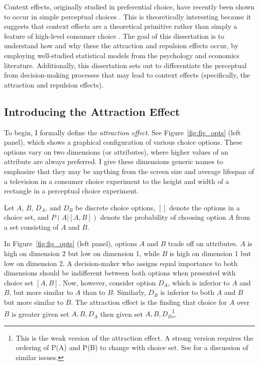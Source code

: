 Context effects, originally studied in preferential choice, have recently been shown to occur in simple perceptual choices \parencite{trueblood2013not,spektorWhenGoodLooks2018b,liaoInfluenceDistanceDecoy2021,spektorRepulsionEffectPreferential2022,evansImpactPresentationOrder2021}. This is theoretically interesting because it suggests that context effects are a theoretical primitive rather than simply a feature of high-level consumer choice \parencite{trueblood2013not}. The goal of this dissertation is to understand how and why these the attraction and repulsion effects occur, by employing well-studied statistical models from the psychology and economics literature. Additionally, this dissertation sets out to differentiate the perceptual from decision-making processes that may lead to context effects (specifically, the attraction and repulsion effects).

\subsection{Introducing the Attraction Effect}

To begin, I formally define the \textit{attraction effect}. See Figure~\ref{fig:fig_opts} (left panel), which shows a graphical configuration of various choice options. These options vary on two dimensions (or attributes), where higher values of an attribute are always preferred. I give these dimensions generic names to emphasize that they may be anything from the screen size and average lifespan of a television in a consumer choice experiment to the height and width of a rectangle in a perceptual choice experiment.

Let $A$, $B$, $D_{A}$, and $D_{B}$ be discrete choice options, $[]$ denote the options in a choice set, and $P(A|[A,B])$ denote the probability of choosing option $A$ from a set consisting of $A$ and $B$. 

In Figure~\ref{fig:fig_opts} (left panel), options $A$ and $B$ trade off on attributes. $A$ is high on dimension 2 but low on dimension 1, while $B$ is high on dimension 1 but low on dimension 2. A decision-maker who assigns equal importance to both dimensions should be indifferent between both options when presented with choice set $[A,B]$. Now, however, consider option $D_{A}$, which is inferior to $A$ and $B$, but more similar to $A$ than to $B$. Similarly, $D_{B}$ is inferior to both $A$ and $B$ but more similar to $B$. The attraction effect is the finding that choice for $A$ over $B$ is greater given set ${A,B,D_{A}}$ then given set $A,B,D_{B}$\footnote{This is the weak version of the attraction effect. A strong version requires the ordering of P(A) and P(B) to change with choice set. See \textcite{davis2023illustrated} for a discussion of similar issues.}. 

